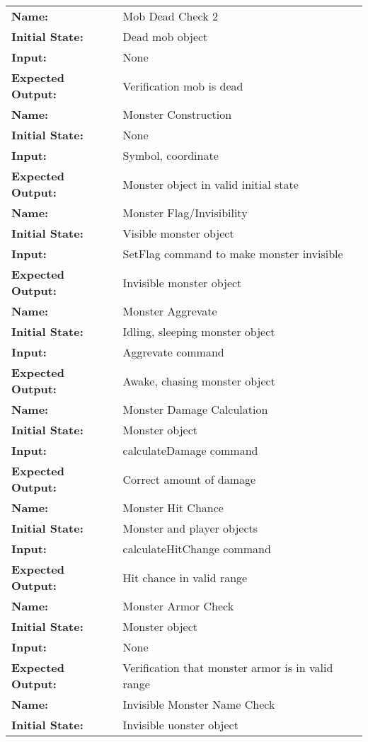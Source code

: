 \documentclass[12pt, titlepage]{article}
\begin{document}
\begin{center}
\begin{longtable}{ l | l }
\hline
\textbf{Name:} & Mob Dead Check 2\\
\textbf{Initial State:} & Dead mob object\\
\textbf{Input:} & None\\
\textbf{Expected Output:} & Verification mob is dead\\
\hline
\textbf{Name:} & Monster Construction\\
\textbf{Initial State:} & None\\
\textbf{Input:} & Symbol, coordinate\\
\textbf{Expected Output:} & Monster object in valid initial state\\
\hline
\textbf{Name:} & Monster Flag/Invisibility\\
\textbf{Initial State:} & Visible monster object\\
\textbf{Input:} & SetFlag command to make monster invisible\\
\textbf{Expected Output:} & Invisible monster object\\
\hline
\textbf{Name:} & Monster Aggrevate\\
\textbf{Initial State:} & Idling, sleeping monster object\\
\textbf{Input:} & Aggrevate command\\
\textbf{Expected Output:} & Awake, chasing monster object\\
\hline
\textbf{Name:} & Monster Damage Calculation\\
\textbf{Initial State:} & Monster object\\
\textbf{Input:} & calculateDamage command\\
\textbf{Expected Output:} & Correct amount of damage\\
\hline
\textbf{Name:} & Monster Hit Chance\\
\textbf{Initial State:} & Monster and player objects\\
\textbf{Input:} & calculateHitChange command\\
\textbf{Expected Output:} & Hit chance in valid range\\
\hline
\textbf{Name:} & Monster Armor Check\\
\textbf{Initial State:} & Monster object\\
\textbf{Input:} & None\\
\textbf{Expected Output:} & Verification that monster armor is in valid range\\
\hline
\textbf{Name:} & Invisible Monster Name Check\\
\textbf{Initial State:} & Invisible uonster object\\

\end{longtable}
\end{center}
\end{document}
